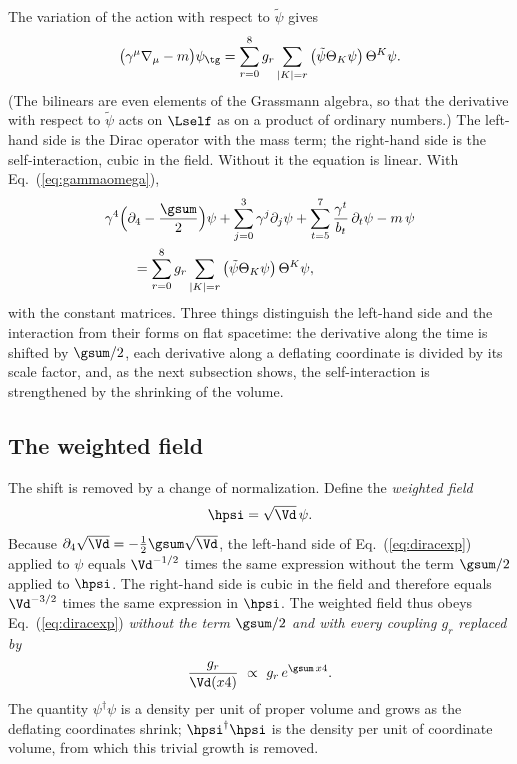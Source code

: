 The variation of the action with respect to $\tilde\psi$ gives
\begin{equation}
\big(\gamma^{\mu}\nabla_\mu-m\big)\psi_{\tg}=\sum_{r=0}^{8}g_r\sum_{|K|=r}\big(\tilde\psi\Theta_K\psi\big)\,\Theta^{K}\psi .
\label{eq:dirac}
\end{equation}
(The bilinears are even elements of the Grassmann algebra, so that the derivative with respect to
$\tilde\psi$ acts on $\Lself$ as on a product of ordinary numbers.) The left-hand side is the Dirac
operator with the mass term; the right-hand side is the self-interaction, cubic in the field.
Without it the equation is linear. With Eq.~(\ref{eq:gammaomega}),
\begin{equation}
\begin{aligned}
&\gamma^{4}\Big(\partial_4-\frac{\gsum}{2}\Big)\psi+\sum_{j=0}^{3}\gamma^{j}\partial_j\psi
+\sum_{t=5}^{7}\frac{\gamma^{t}}{b_t}\,\partial_t\psi-m\,\psi\\
&\qquad=\sum_{r=0}^{8}g_r\sum_{|K|=r}\big(\tilde\psi\Theta_K\psi\big)\,\Theta^{K}\psi,
\end{aligned}
\label{eq:diracexp}
\end{equation}
with the constant matrices. Three things distinguish the left-hand side and the interaction from
their forms on flat spacetime: the derivative along the time is shifted by $\gsum/2$, each
derivative along a deflating coordinate is divided by its scale factor, and, as the next subsection
shows, the self-interaction is strengthened by the shrinking of the volume.

\subsection{The weighted field}

The shift is removed by a change of normalization. Define the \emph{weighted field}
\begin{equation}
\hpsi=\sqrt{\Vd}\,\psi .
\label{eq:weighted}
\end{equation}
Because $\partial_4\sqrt{\Vd}=-\tfrac12\gsum\sqrt{\Vd}$, the left-hand side of
Eq.~(\ref{eq:diracexp}) applied to $\psi$ equals $\Vd^{-1/2}$ times the same expression without the
term $\gsum/2$ applied to $\hpsi$. The right-hand side is cubic in the field and therefore equals
$\Vd^{-3/2}$ times the same expression in $\hpsi$. The weighted field thus obeys
Eq.~(\ref{eq:diracexp}) \emph{without the term $\gsum/2$ and with every coupling $g_r$ replaced by}
\begin{equation}
\frac{g_r}{\Vd(x4)}\ \propto\ g_r\,e^{\gsum\,x4} .
\label{eq:grun}
\end{equation}
The quantity $\psi^\dagger\psi$ is a density per unit of proper volume and grows as the deflating
coordinates shrink; $\hpsi^\dagger\hpsi$ is the density per unit of coordinate volume, from which
this trivial growth is removed.


